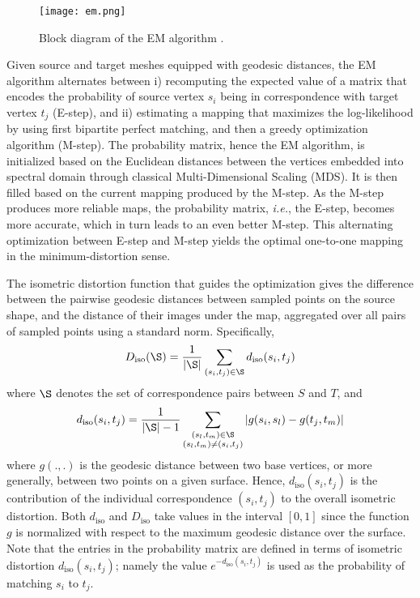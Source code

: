 \begin{figure} [t!]
\begin{center}
\texttt{[image: em.png]}
\end{center}
   \caption{Block diagram of the EM algorithm \cite{ys2012EM}.}
\label{fig:em}
\end{figure}

Given source and target meshes equipped with geodesic distances, the EM algorithm alternates between i) recomputing the expected value of a matrix that encodes the probability of source vertex $s_i$ being in correspondence with target vertex $t_j$ (E-step), and ii) estimating a mapping that maximizes the log-likelihood by using first bipartite perfect matching, and then a greedy optimization algorithm (M-step). The probability matrix, hence the EM algorithm, is initialized based on the Euclidean distances between the vertices embedded into spectral domain through classical Multi-Dimensional Scaling (MDS). It is then filled based on the current mapping produced by the M-step. As the M-step produces more reliable maps, the probability matrix, \emph{i.e.}, the E-step, becomes more accurate, which in turn leads to an even better M-step. This alternating optimization between E-step and M-step yields the optimal one-to-one mapping in the minimum-distortion sense.

The isometric distortion function that guides the optimization gives the difference between the pairwise geodesic distances between sampled points on the source shape, and the distance of their images under the map, aggregated over all pairs of sampled points using a standard norm. Specifically, 
\begin{equation}
D_{\mathrm{iso}}(\S) = \frac{1}{|\S|} \sum_{(s_i, t_j) \in \S} d_{\mathrm{iso}}(s_i, t_j)\label{eq:iso}
\end{equation}
where $\S$ denotes the set of correspondence pairs between $S$ and $T$, and
\begin{equation}
d_{\mathrm{iso}}(s_i, t_j) = \frac{1}{|\S|-1} \sum_{\substack{(s_l, t_m) \in \S\\(s_l, t_m)\neq(s_i, t_j)}} |g(s_i, s_l) - g(t_j, t_m)|
\label{eq:diso}
\end{equation}
where $g(.,.)$ is the geodesic distance between two base vertices, or more generally, between two points on a given surface. Hence, $d_{\mathrm{iso}}(s_i, t_j)$ is the contribution of the individual correspondence $(s_i, t_j)$ to the overall isometric distortion. Both $d_{\mathrm{iso}}$ and $D_{\mathrm{iso}}$ take values in the interval $[0,1]$ since the function $g$ is normalized with respect to the maximum geodesic distance over the surface. Note that the entries in the probability matrix are defined in terms of isometric distortion $d_{\mathrm{iso}}(s_i, t_j)$; namely the value $e^{-d_{\mathrm{iso}}(s_i,t_j)}$ is used as the probability of matching $s_i$ to $t_j$.

